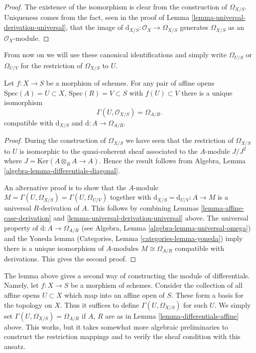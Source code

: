 \begin{proof}
The existence of the isomorphism is clear from the construction
of $\Omega_{X/S}$. Uniqueness comes from the fact, seen in
the proof of Lemma \ref{lemma-universal-derivation-universal},
that the image of $\text{d}_{X/S} : \mathcal{O}_X \to \Omega_{X/S}$ generates
$\Omega_{X/S}$ as an $\mathcal{O}_X$-module.
\end{proof}

\noindent
From now on we will use these canonical identifications and simply
write $\Omega_{U/S}$ or $\Omega_{U/V}$ for the restriction of
$\Omega_{X/S}$ to $U$.

\begin{lemma}
\label{lemma-differentials-affine}
Let $f : X \to S$ be a morphism of schemes.
For any pair of affine opens $\text{Spec}(A) = U \subset X$,
$\text{Spec}(R) = V \subset S$ with $f(U) \subset V$ there is
a unique isomorphism
$$
\Gamma(U, \mathcal{O}_{X/S}) =
\Omega_{A/R}.
$$
compatible with $\text{d}_{X/S}$ and $\text{d} : A \to \Omega_{A/R}$.
\end{lemma}

\begin{proof}
During the construction of $\Omega_{X/S}$ we have seen that
the restriction of $\Omega_{X/S}$ to $U$ is isomorphic to the quasi-coherent
sheaf associated to the $A$-module $J/J^2$ where
$J = \text{Ker}(A \otimes_R A \to A)$. Hence the result follows from
Algebra, Lemma \ref{algebra-lemma-differentials-diagonal}.

\medskip\noindent
An alternative proof is to show that the $A$-module
$M = \Gamma(U, \Omega_{X/S}) = \Gamma(U, \Omega_{U/V})$
together with $\text{d}_{X/S} = \text{d}_{U/V} : A \to M$
is a universal $R$-derivation of $A$. This follows by combining
Lemmas \ref{lemma-affine-case-derivation}
and \ref{lemma-universal-derivation-universal} above.
The universal property of
$\text{d} : A \to \Omega_{A/R}$
(see Algebra, Lemma \ref{algebra-lemma-universal-omega})
and the Yoneda lemma
(Categories, Lemma \ref{categories-lemma-yoneda})
imply there is a unique isomorphism of $A$-modules
$M \cong \Omega_{A/R}$ compatible with derivations.
This gives the second proof.
\end{proof}

\begin{remark}
\label{remark-differentials-glue}
The lemma above gives a second way of constructing the module of
differentials. Namely, let $f : X \to S$ be a morphism of schemes.
Consider the collection of all affine opens $U \subset X$ which
map into an affine open of $S$. These form a basis for the topology
on $X$. Thus it suffices to define $\Gamma(U, \Omega_{X/S})$
for such $U$. We simply set $\Gamma(U, \Omega_{X/S}) = \Omega_{A/R}$ if
$A$, $R$ are as in Lemma \ref{lemma-differentials-affine} above.
This works, but it takes somewhat more algebraic preliminaries
to construct the restriction mappings and to verify the sheaf
condition with this ansatz.
\end{remark}

